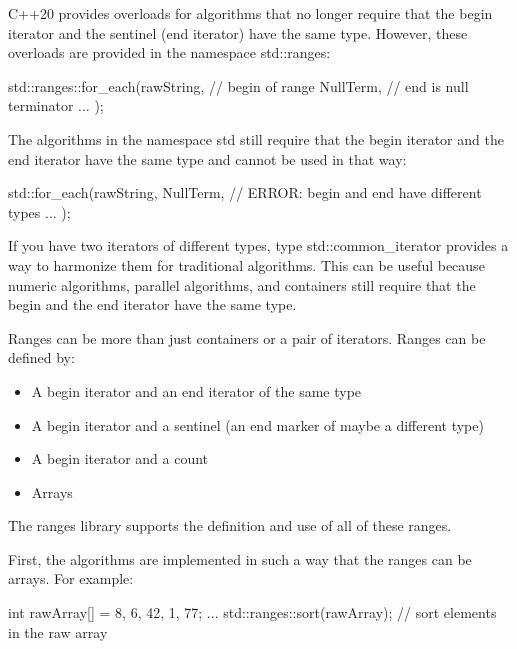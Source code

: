 C++20 provides overloads for algorithms that no longer require that the begin iterator and the sentinel (end iterator) have the same type. However, these overloads are provided in the namespace std::ranges:

\begin{cpp}
std::ranges::for_each(rawString, // begin of range
						NullTerm{}, // end is null terminator
						... );
\end{cpp}

The algorithms in the namespace std still require that the begin iterator and the end iterator have the same type and cannot be used in that way:

\begin{cpp}
std::for_each(rawString, NullTerm{}, // ERROR: begin and end have different types
			... );
\end{cpp}

If you have two iterators of different types, type std::common\_iterator provides a way to harmonize them for traditional algorithms. This can be useful because numeric algorithms, parallel algorithms, and containers still require that the begin and the end iterator have the same type.


Ranges can be more than just containers or a pair of iterators. Ranges can be defined by:

\begin{itemize}
\item
A begin iterator and an end iterator of the same type

\item
A begin iterator and a sentinel (an end marker of maybe a different type)

\item
A begin iterator and a count

\item
Arrays
\end{itemize}

The ranges library supports the definition and use of all of these ranges.

First, the algorithms are implemented in such a way that the ranges can be arrays. For example:

\begin{cpp}
int rawArray[] = {8, 6, 42, 1, 77};
...
std::ranges::sort(rawArray); // sort elements in the raw array
\end{cpp}

